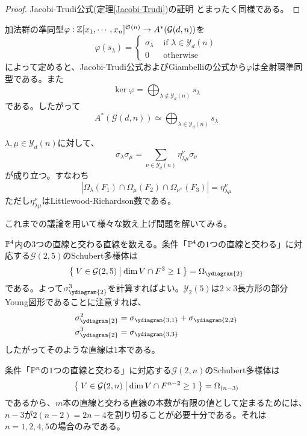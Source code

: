 \documentclass{ltjsreport}
\begin{document}
\begin{proof}
  Jacobi-Trudi公式(定理\ref{Jacobi-Trudi})の証明
  とまったく同様である。
\end{proof}


加法群の準同型$\varphi:\mathbb{Z}[x_1,\cdots,x_n]^{\mathfrak{S}(n)}\rightarrow A^*(\mathcal{G}(d,n))$を
\[
\varphi(s_\lambda)=\left\{\begin{array}{cc}
  \sigma_{\lambda} & \text{ if } \lambda\in\mathcal{Y}_d(n)\\
  0 & \text{ otherwise}
\end{array}\right.
\]
によって定めると、Jacobi-Trudi公式およびGiambelliの公式から$\varphi$は全射環準同型である。また
\[
\ker\varphi=\bigoplus_{\lambda\notin\mathcal{Y}_d(n)}s_\lambda
\]
である。したがって
\[
  A^*(\mathcal{G}(d,n))\simeq\bigoplus_{\lambda\in\mathcal{Y}_d(n)}s_\lambda
\]

\begin{cor}
  $\lambda,\mu\in\mathcal{Y}_d(n)$に対して、
  \[
  \sigma_\lambda\sigma_\mu=\sum_{\nu\in\mathcal{Y}_d(n)}\eta_{\lambda\mu}^\nu\sigma_\nu  
  \]
  が成り立つ。すなわち
  \[
  |\Omega_{\lambda}(F_1)\cap\Omega_{\mu}(F_2)\cap\Omega_{\nu^\vee}(F_3)|=\eta_{\lambda\mu}^\nu  
  \]
  ただし$\eta_{\lambda\mu}^\nu$はLittlewood-Richardson数である。
\end{cor}


これまでの議論を用いて様々な数え上げ問題を解いてみる。

\begin{eg}
  $\mathbb{P}^4$内の3つの直線と交わる直線を数える。条件「$\mathbb{P}^4$の$1$つの直線と交わる」に対応する$\mathcal{G}(2,5)$のSchubert多様体は
  \[
  \set{V\in\mathcal{G}(2,5)}{\dim V\cap F^3 \geq 1}=\Omega_{\ydiagram{2}}  
  \]
  である。よって$\sigma_{\ydiagram{2}}^3$を計算すればよい。$\mathcal{Y}_2(5)$は$2\times 3$長方形の部分Young図形であることに注意すれば、
  \begin{align*}
  &\sigma_{\ydiagram{2}}^2=\sigma_{\ydiagram{3,1}}+\sigma_{\ydiagram{2,2}}\\
  &\sigma_{\ydiagram{2}}^3=\sigma_{\ydiagram{3,3}}
  \end{align*}
  したがってそのような直線は$1$本である。
\end{eg}

\begin{eg}
  条件「$\mathbb{P}^n$の$1$つの直線と交わる」に対応する$\mathcal{G}(2,n)$のSchubert多様体は
  \[
  \left\{\:V\in\mathcal{G}(2,n)\:\middle|\:\dim V\cap F^{n-2}\geq 1\:\right\}=\Omega_{(n-3)}  
  \]
  であるから、$m$本の直線と交わる直線の本数が有限の値として定まるためには、$n-3$が$2(n-2)=2n-4$を割り切ることが必要十分である。それは$n=1,2,4,5$の場合のみである。
\end{eg}
\end{document}
